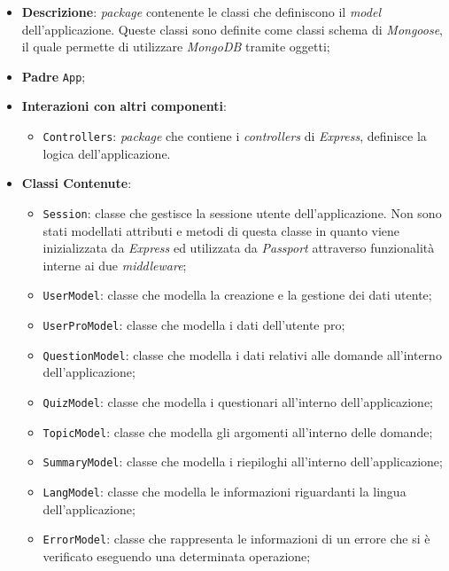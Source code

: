 \begin{itemize}
	\item \textbf{Descrizione}: \textit{package} contenente le classi che definiscono il \textit{model} dell'applicazione. Queste classi sono definite come classi schema di \textit{Mongoose}, il quale permette di utilizzare \textit{MongoDB} tramite oggetti;
	\item \textbf{Padre} \texttt{App};
	\item \textbf{Interazioni con altri componenti}:
	\begin{itemize}
		\item \texttt{Controllers}:
		\textit{package} che contiene i \textit{controllers}  di \textit{Express}, definisce la logica dell'applicazione.
	\end{itemize}
	\item \textbf{Classi Contenute}:
	\begin{itemize}
		\item \texttt{Session}: classe che gestisce la sessione utente dell'applicazione. Non sono stati modellati attributi e metodi di questa classe in quanto viene inizializzata da \textit{Express} ed utilizzata da \textit{Passport} attraverso funzionalità interne ai due \textit{middleware};
		\item \texttt{UserModel}: classe che modella la creazione e la gestione dei dati utente;
		\item \texttt{UserProModel}: classe che modella i dati dell'utente pro;
		\item \texttt{QuestionModel}: classe che modella i dati relativi alle domande all'interno dell'applicazione;
		\item \texttt{QuizModel}: classe che modella i questionari all'interno dell'applicazione;
		\item \texttt{TopicModel}: classe che modella gli argomenti all'interno delle domande;
		\item \texttt{SummaryModel}: classe che modella i riepiloghi all'interno dell'applicazione;
		\item \texttt{LangModel}: classe che modella le informazioni riguardanti la lingua dell'applicazione;
		\item \texttt{ErrorModel}: classe che rappresenta le informazioni di un errore che si è verificato eseguendo una determinata operazione;
	\end{itemize}
\end{itemize}